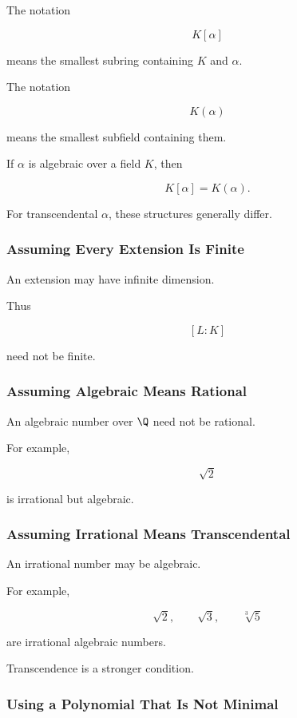 The notation

\[ K[\alpha] \]

means the smallest subring containing \(K\) and \(\alpha\).

The notation

\[ K(\alpha) \]

means the smallest subfield containing them.

If \(\alpha\) is algebraic over a field \(K\), then

\[ K[\alpha]=K(\alpha). \]

For transcendental \(\alpha\), these structures generally differ.

\subsubsection{Assuming Every Extension Is Finite}

An extension may have infinite dimension.

Thus

\[ [L:K] \]

need not be finite.

\subsubsection{Assuming Algebraic Means Rational}

An algebraic number over \(\Q\) need not be rational.

For example,

\[ \sqrt2 \]

is irrational but algebraic.

\subsubsection{Assuming Irrational Means Transcendental}

An irrational number may be algebraic.

For example,

\[ \sqrt2,\qquad\sqrt3,\qquad\sqrt[3]{5} \]

are irrational algebraic numbers.

Transcendence is a stronger condition.

\subsubsection{Using a Polynomial That Is Not Minimal}

